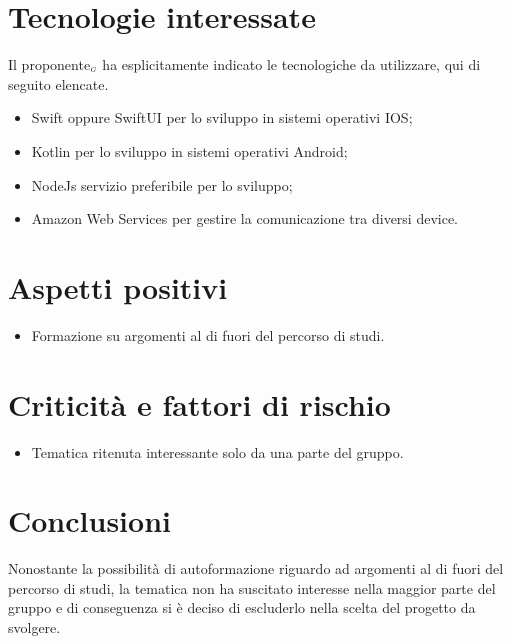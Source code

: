 \section{Tecnologie interessate} \label{C6TecnologieInteressate}
Il proponente$_{\scaleto{G}{3pt}}$ ha esplicitamente indicato le tecnologiche da utilizzare, qui di seguito elencate.
\begin{itemize}
	\item Swift oppure SwiftUI per lo sviluppo in sistemi operativi IOS;
	\item Kotlin per lo sviluppo in sistemi operativi Android;
	\item NodeJs servizio preferibile per lo sviluppo;
	\item Amazon Web Services per gestire la comunicazione tra diversi device.
\end{itemize}
\section{Aspetti positivi} \label{C6AspettiPositivi}
\begin{itemize}
	\item Formazione su argomenti al di fuori del percorso di studi.
\end{itemize}
\section{Criticità e fattori di rischio} \label{C6CriticitàEFattoriDiRischio}
\begin{itemize}
	\item Tematica ritenuta interessante solo da una parte del gruppo.
\end{itemize}
\section{Conclusioni} \label{C6Conclusioni}
Nonostante la possibilità di autoformazione riguardo ad argomenti al di fuori del percorso di studi, la tematica non ha suscitato interesse nella maggior parte del gruppo e di conseguenza si è deciso di escluderlo nella scelta del progetto da svolgere.